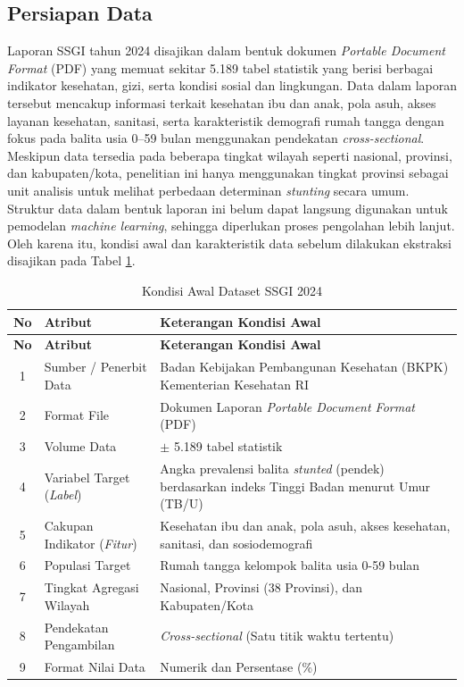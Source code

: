 \subsection{Persiapan Data}
Laporan SSGI tahun 2024 disajikan dalam bentuk dokumen \textit{Portable Document Format} (PDF) yang memuat sekitar 5.189 tabel statistik yang berisi berbagai indikator kesehatan, gizi, serta kondisi sosial dan lingkungan. Data dalam laporan tersebut mencakup informasi terkait kesehatan ibu dan anak, pola asuh, akses layanan kesehatan, sanitasi, serta karakteristik demografi rumah tangga dengan fokus pada balita usia 0--59 bulan menggunakan pendekatan \textit{cross-sectional}. Meskipun data tersedia pada beberapa tingkat wilayah seperti nasional, provinsi, dan kabupaten/kota, penelitian ini hanya menggunakan tingkat provinsi sebagai unit analisis untuk melihat perbedaan determinan \textit{stunting} secara umum. Struktur data dalam bentuk laporan ini belum dapat langsung digunakan untuk pemodelan \textit{machine learning}, sehingga diperlukan proses pengolahan lebih lanjut. Oleh karena itu, kondisi awal dan karakteristik data sebelum dilakukan ekstraksi disajikan pada Tabel \ref{table:4.kondisi_awal}.

\begin{longtable}{|c|p{}|p{}|}
    \caption{Kondisi Awal Dataset SSGI 2024}
    \label{table:4.kondisi_awal}\\
    \hline
    \textbf{No} & \centering\textbf{Atribut} & \textbf{Keterangan Kondisi Awal} \\ 
    \hline
    \endfirsthead
    \hline
    \textbf{No} & \centering\textbf{Atribut} & \textbf{Keterangan Kondisi Awal} \\ 
    \hline
    \endhead
    \hline
    1 & Sumber / Penerbit Data & Badan Kebijakan Pembangunan Kesehatan (BKPK) Kementerian Kesehatan RI \\
    \hline
    2 & Format File & Dokumen Laporan \textit{Portable Document Format} (PDF) \\ 
    \hline
    3 & Volume Data & $\pm$ 5.189 tabel statistik \\
    \hline
    4 & Variabel Target (\textit{Label}) & Angka prevalensi balita \textit{stunted} (pendek) berdasarkan indeks Tinggi Badan menurut Umur (TB/U) \\
    \hline
    5 & Cakupan Indikator (\textit{Fitur}) & Kesehatan ibu dan anak, pola asuh, akses kesehatan, sanitasi, dan sosiodemografi \\
    \hline
    6 & Populasi Target & Rumah tangga kelompok balita usia 0-59 bulan \\
    \hline
    7 & Tingkat Agregasi Wilayah & Nasional, Provinsi (38 Provinsi), dan Kabupaten/Kota \\
    \hline
    8 & Pendekatan Pengambilan & \textit{Cross-sectional} (Satu titik waktu tertentu) \\
    \hline
    9 & Format Nilai Data & Numerik dan Persentase (\%) \\
    \hline
\end{longtable}

